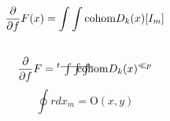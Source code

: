 \documentclass{jsarticle}
\begin{document}
\title{}
\author{}
\date{}
\maketitle


\newcommand{\varint}{%
	\begin{picture}(15,30)
		\put(0,0){
			$ \int \int \int $}
		\put(0,5){\line(15,0){30}}
	\end{picture} %
}


 $$ {\partial \over \partial f}F(x) = \int \int \text{cohom}D_k(x)[I_m]  $$
 $$ {\partial \over \partial f}F = {{}^t \varint} \text{cohom}D_k(x)^{\ll p} $$
 $$ \oint r dx_m = \mathrm{O}(x,y) $$
\end{document}
